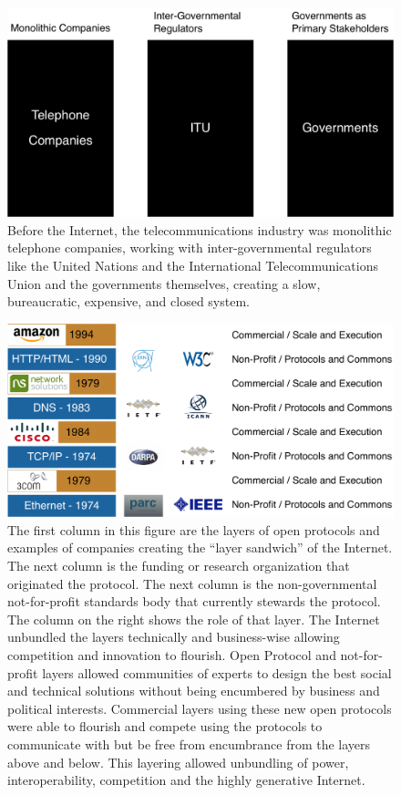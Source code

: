 \begin{figure}[h]
 \centering
 \includegraphics[width=1\textwidth]{pictures/monolith}
 \caption[Structure of telecommunications ecosystem before the Internet.]{Before the Internet, the telecommunications industry was monolithic telephone companies, working with inter-governmental regulators like the United Nations and the International Telecommunications Union and the governments themselves, creating a slow, bureaucratic, expensive, and closed system.}
 \label{fig:monolith}
\end{figure}

\begin{figure}[h]
 \centering
 \includegraphics[width=1\textwidth]{pictures/InternetLayers}
\caption[Structure of telecommunications ecosystem after the Internet and its layers.]{The first column in this figure are the layers of open protocols and examples of companies creating the ``layer sandwich'' of the Internet. The next column is the funding or research organization that originated the protocol. The next column is the non-governmental not-for-profit standards body that currently stewards the protocol. The column on the right shows the role of that layer. The Internet unbundled the layers technically and business-wise allowing competition and innovation to flourish. Open Protocol and not-for-profit layers allowed communities of experts to design the best social and technical solutions without being encumbered by business and political interests. Commercial layers using these new open protocols were able to flourish and compete using the protocols to communicate with but be free from encumbrance from the layers above and below. This layering allowed unbundling of power, interoperability, competition and the highly generative Internet.}
\label{layertable}
\end{figure}


